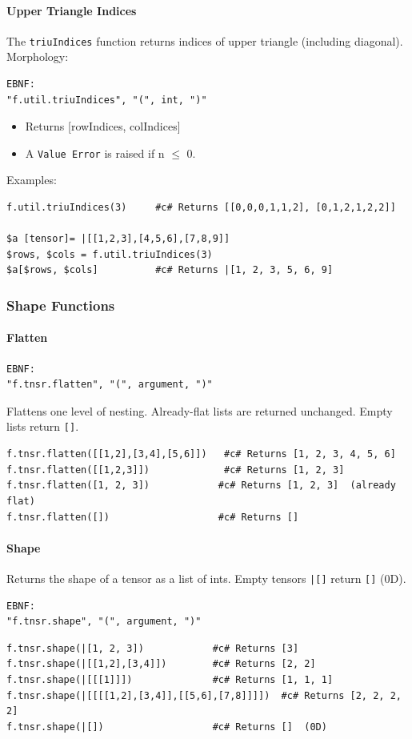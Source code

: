 \paragraph{Upper Triangle Indices}
The \texttt{triuIndices} function returns indices of upper triangle (including diagonal).\\
Morphology:
\begin{verbatim}
EBNF:
"f.util.triuIndices", "(", int, ")"
\end{verbatim}
\begin{itemize}
\item Returns [rowIndices, colIndices]
\item A \texttt{Value Error} is raised if n $\leq$ 0.
\end{itemize}
Examples:
\begin{verbatim}
f.util.triuIndices(3)     #c# Returns [[0,0,0,1,1,2], [0,1,2,1,2,2]]

$a [tensor]= |[[1,2,3],[4,5,6],[7,8,9]]
$rows, $cols = f.util.triuIndices(3)
$a[$rows, $cols]          #c# Returns |[1, 2, 3, 5, 6, 9]
\end{verbatim}

\subsubsection{Shape Functions}
\paragraph{Flatten}
\begin{verbatim}
EBNF:
"f.tnsr.flatten", "(", argument, ")"
\end{verbatim}
Flattens one level of nesting. Already-flat lists are returned unchanged. Empty lists return \texttt{[]}.
\begin{verbatim}
f.tnsr.flatten([[1,2],[3,4],[5,6]])   #c# Returns [1, 2, 3, 4, 5, 6]
f.tnsr.flatten([[1,2,3]])             #c# Returns [1, 2, 3]
f.tnsr.flatten([1, 2, 3])            #c# Returns [1, 2, 3]  (already flat)
f.tnsr.flatten([])                   #c# Returns []
\end{verbatim}

\paragraph{Shape}
Returns the shape of a tensor as a list of ints. Empty tensors \texttt{|[]} return \texttt{[]} (0D).
\begin{verbatim}
EBNF:
"f.tnsr.shape", "(", argument, ")"
\end{verbatim}
\begin{verbatim}
f.tnsr.shape(|[1, 2, 3])            #c# Returns [3]
f.tnsr.shape(|[[1,2],[3,4]])        #c# Returns [2, 2]
f.tnsr.shape(|[[[1]]])              #c# Returns [1, 1, 1]
f.tnsr.shape(|[[[[1,2],[3,4]],[[5,6],[7,8]]]])  #c# Returns [2, 2, 2, 2]
f.tnsr.shape(|[])                   #c# Returns []  (0D)
\end{verbatim}

